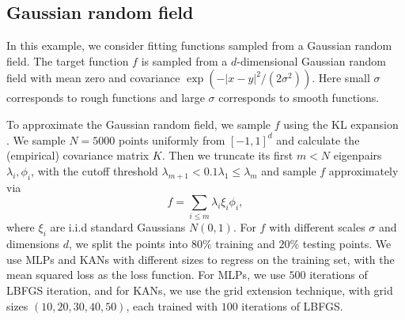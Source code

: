 \documentclass[12pt]{caltech_thesis}
\numberwithin{equation}{section}
\begin{document}


    
    
\subsection{Gaussian random field}
In this example, we consider fitting functions sampled from a Gaussian random field.
The target function $f$ is sampled from a $d$-dimensional Gaussian random field with mean zero and covariance $\exp(-|x-y|^2/(2\sigma^2))$.  Here small $\sigma$ corresponds to rough functions and large $\sigma$ corresponds to smooth functions. 

To approximate the Gaussian random field, we sample $f$ using the KL expansion \cite{karhunen1947under}. We sample $N=5000$ points uniformly from $[-1,1]^d$ and calculate the (empirical) covariance matrix $K$. Then we truncate its first $m<N$ eigenpairs $\lambda_i,\phi_i$, with the cutoff threshold $\lambda_{m+1}<0.1\lambda_{1}\leq\lambda_{m}$ and sample $f$ approximately via $$f=\sum_{i\leq m}\lambda_i\xi_i\phi_i,$$ where $\xi_i$ are i.i.d standard Gaussians $N(0,1)$. For $f$ with different scales $\sigma$ and dimensions $d$, we split the points into $80\%$ training and $20\%$ testing points. We use MLPs and KANs with different sizes to regress on the training set, with the mean squared loss as the loss function. For MLPs, we use $500$ iterations of LBFGS iteration, and for KANs, we use the grid extension technique, with grid sizes $(10,20,30,40,50)$, each trained with $100$ iterations of LBFGS.
\end{document}
